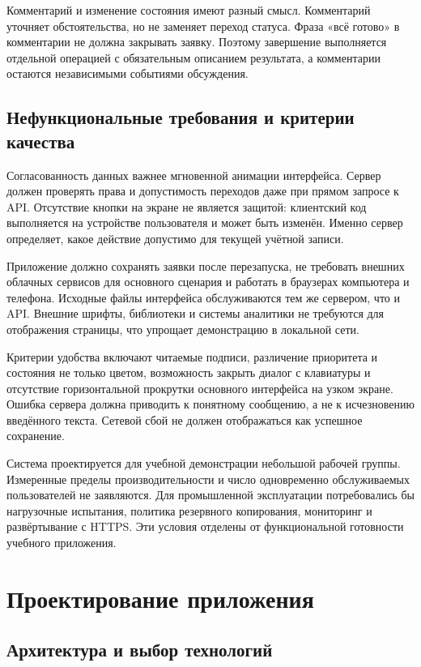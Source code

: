\documentclass{timcw}
\begin{document}
Комментарий и изменение состояния имеют разный смысл. Комментарий уточняет обстоятельства, но не заменяет переход статуса. Фраза «всё готово» в комментарии не должна закрывать заявку. Поэтому завершение выполняется отдельной операцией с обязательным описанием результата, а комментарии остаются независимыми событиями обсуждения.

\section{Нефункциональные требования и критерии качества}

Согласованность данных важнее мгновенной анимации интерфейса. Сервер должен проверять права и допустимость переходов даже при прямом запросе к API. Отсутствие кнопки на экране не является защитой: клиентский код выполняется на устройстве пользователя и может быть изменён. Именно сервер определяет, какое действие допустимо для текущей учётной записи.

Приложение должно сохранять заявки после перезапуска, не требовать внешних облачных сервисов для основного сценария и работать в браузерах компьютера и телефона. Исходные файлы интерфейса обслуживаются тем же сервером, что и API. Внешние шрифты, библиотеки и системы аналитики не требуются для отображения страницы, что упрощает демонстрацию в локальной сети.

Критерии удобства включают читаемые подписи, различение приоритета и состояния не только цветом, возможность закрыть диалог с клавиатуры и отсутствие горизонтальной прокрутки основного интерфейса на узком экране. Ошибка сервера должна приводить к понятному сообщению, а не к исчезновению введённого текста. Сетевой сбой не должен отображаться как успешное сохранение.

 Система проектируется для учебной демонстрации небольшой рабочей группы. Измеренные пределы производительности и число одновременно обслуживаемых пользователей не заявляются. Для промышленной эксплуатации потребовались бы нагрузочные испытания, политика резервного копирования, мониторинг и развёртывание с HTTPS. Эти условия отделены от функциональной готовности учебного приложения.

\chapter{Проектирование приложения}

\section{Архитектура и выбор технологий}
\end{document}
